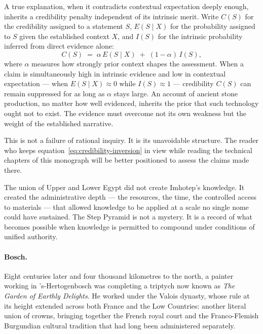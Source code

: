 A true explanation, when it contradicts contextual expectation deeply
enough, inherits a credibility penalty independent of its intrinsic merit.
Write $C(S)$ for the credibility assigned to a statement $S$,
$E(S \mid X)$ for the probability assigned to $S$ given the established
context $X$, and $I(S)$ for the intrinsic probability inferred from
direct evidence alone:
%
\begin{equation}
  C(S) \;=\; \alpha\,E(S \mid X) \;+\; (1-\alpha)\,I(S),
  \label{eq:credibility-inversion}
\end{equation}
%
where $\alpha$ measures how strongly prior context shapes the assessment.
When a claim is simultaneously high in intrinsic evidence and low in
contextual expectation --- when $E(S \mid X) \approx 0$ while
$I(S) \approx 1$ --- credibility $C(S)$ can remain suppressed for as long
as $\alpha$ stays large.
An account of ancient stone production, no matter how well evidenced,
inherits the prior that such technology ought not to exist.
The evidence must overcome not its own weakness but the weight of the
established narrative.

This is not a failure of rational inquiry.
It is its unavoidable structure.
The reader who keeps equation~\eqref{eq:credibility-inversion} in view
while reading the technical chapters of this monograph will be better
positioned to assess the claims made there.

The union of Upper and Lower Egypt did not create Imhotep's knowledge.
It created the administrative depth --- the resources, the time, the
controlled access to materials --- that allowed knowledge to be applied
at a scale no single nome could have sustained.
The Step Pyramid is not a mystery.
It is a record of what becomes possible when knowledge is permitted to
compound under conditions of unified authority.

\bigskip
\paragraph{Bosch.}

Eight centuries later and four thousand kilometres to the north,
a painter working in 's-Hertogenbosch was completing a triptych now known
as \textit{The Garden of Earthly Delights}.
He worked under the Valois dynasty, whose rule at its height extended
across both France and the Low Countries: another literal union of crowns,
bringing together the French royal court and the Franco-Flemish Burgundian
cultural tradition that had long been administered separately.

